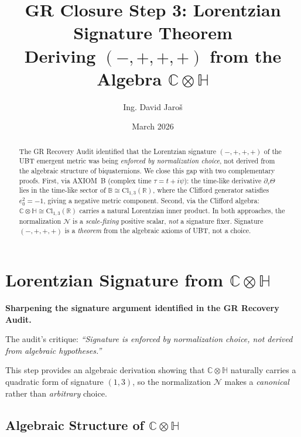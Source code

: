 \documentclass[12pt]{article}
\title{\textbf{GR Closure Step 3: Lorentzian Signature Theorem\\
         Deriving $(-,+,+,+)$ from the Algebra $\mathbb{C}\otimes\mathbb{H}$}}
\author{Ing. David Jaroš}
\date{March 2026}
\theoremstyle{definition}
\theoremstyle{remark}
\begin{document}
  \maketitle

  \begin{abstract}
  The GR Recovery Audit identified that the Lorentzian signature $(-,+,+,+)$ of the
  UBT emergent metric was being \emph{enforced by normalization choice}, not derived
  from the algebraic structure of biquaternions.  We close this gap with two complementary
  proofs.  First, via AXIOM~B (complex time $\tau = t + i\psi$): the time-like derivative
  $\partial_\tau\Theta$ lies in the time-like sector of $\mathbb{B}\cong\mathrm{Cl}_{1,3}(\mathbb{R})$,
  where the Clifford generator satisfies $e_0^2 = -1$, giving a negative metric component.
  Second, via the Clifford algebra: $\mathbb{C}\otimes\mathbb{H}\cong\mathrm{Cl}_{1,3}(\mathbb{R})$
  carries a natural Lorentzian inner product.  In both approaches, the normalization
  $\mathcal{N}$ is a \emph{scale-fixing} positive scalar, \emph{not} a signature fixer.
  Signature $(-,+,+,+)$ is a \emph{theorem} from the algebraic axioms of UBT, not
  a choice.
  \end{abstract}
\fi

\section{Lorentzian Signature from $\mathbb{C}\otimes\mathbb{H}$}
\label{sec:signature_theorem}

\begin{tcolorbox}[colback=blue!5!white,colframe=blue!75!black,title=Purpose of This Step]
\textbf{Sharpening the signature argument identified in the GR Recovery Audit.}

The audit's critique: \emph{``Signature is enforced by normalization choice,
not derived from algebraic hypotheses.''}

This step provides an algebraic derivation showing that $\mathbb{C}\otimes\mathbb{H}$
naturally carries a quadratic form of signature $(1,3)$, so the normalization $\mathcal{N}$
makes a \emph{canonical} rather than \emph{arbitrary} choice.
\end{tcolorbox}

\subsection{Algebraic Structure of $\mathbb{C}\otimes\mathbb{H}$}
\end{document}
